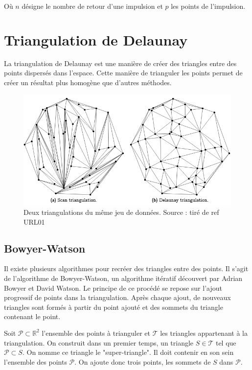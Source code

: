 Où $n$ désigne le nombre de retour d'une impulsion et $p$ les points de l'impulsion.

\section{Triangulation de Delaunay}
La triangulation de Delaunay est une manière de créer des triangles entre des points dispersés dans l’espace.
Cette manière de trianguler les points permet de créer un résultat plus homogène que d’autres méthodes.

\begin{figure}[htb!]
    \centering
    \includegraphics[width=0.8\linewidth]{figures/triangulation-example.png}
    \caption{Deux triangulations du même jeu de données. Source : tiré de ref URL01}
    \label{fig:triangulation_example}
\end{figure}

\subsection{Bowyer-Watson}
Il existe plusieurs algorithmes pour recréer des triangles entre des points.
Il s’agit de l’algorithme de Bowyer-Watson, un algorithme itératif découvert par Adrian Bowyer et David Watson.
Le principe de ce procédé se repose sur l’ajout progressif de points dans la triangulation.
Après chaque ajout, de nouveaux triangles sont formés à partir du point ajouté et des sommets du triangle contenant le point.

Soit $\mathcal{P} \subset \mathbb{R}^2$ l'ensemble des points à trianguler et $\mathcal{T}$ les triangles appartenant à la triangulation. On construit dans un premier temps, un triangle $S \in \mathcal{T}$ tel que $\mathcal{P} \subset S$. On nomme ce triangle le "super-triangle". Il doit contenir en son sein l'ensemble des points $\mathcal{P}$. On ajoute donc trois points, les sommets de $S$ dans $\mathcal{P}$.


